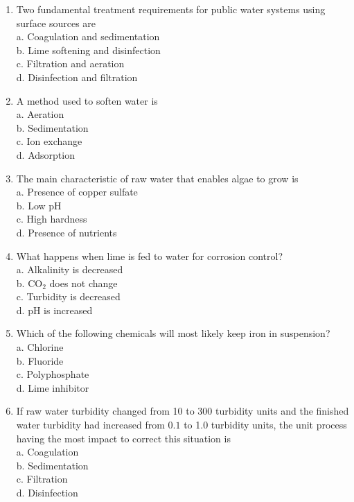 \documentclass[10pt]{article}
\begin{document}
\begin{enumerate}
\begin{enumerate}
\item Two fundamental treatment requirements for public water systems using surface sources are\\

a. Coagulation and sedimentation\\

b. Lime softening and disinfection\\

c. Filtration and aeration\\

d.  Disinfection and filtration\\


\item A method used to soften water is\\
a. Aeration\\
b. Sedimentation\\
c. Ion exchange\\
d. Adsorption\\

\item The main characteristic of raw water that enables algae to grow is\\
a. Presence of copper sulfate\\
b. Low pH\\
c. High hardness\\
d. Presence of nutrients\\

\item What happens when lime is fed to water for corrosion control?\\
a. Alkalinity is decreased\\
b. $\mathrm{CO}_{2}$ does not change\\
c. Turbidity is decreased\\
d. $\mathrm{pH}$ is increased\\

\item Which of the following chemicals will most likely keep iron in suspension?\\
a. Chlorine\\
b. Fluoride\\
c. Polyphosphate\\
d. Lime inhibitor

\item If raw water turbidity changed from 10 to 300 turbidity units and the finished water turbidity had increased from $0.1$ to 1.0 turbidity units, the unit process having the most impact to correct this situation is\\
a. Coagulation\\
b. Sedimentation\\
c. Filtration\\
d. Disinfection


\end{enumerate}
\end{enumerate}
\end{document}
